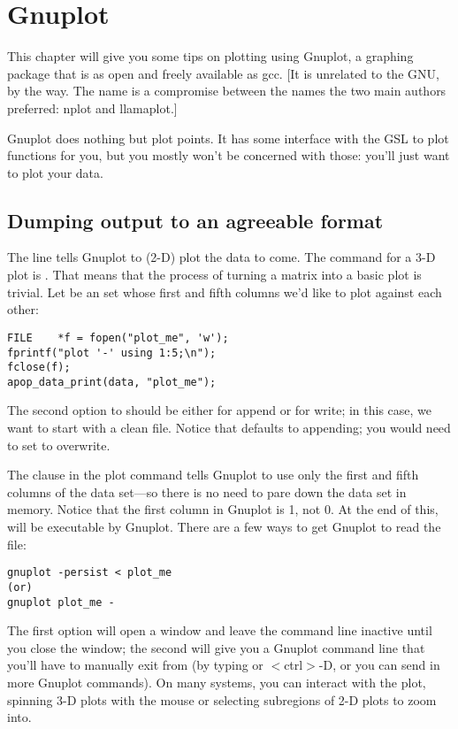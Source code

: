 \chapter{Gnuplot} \label{gnuplot}

This chapter will give you some tips on plotting using Gnuplot, a graphing package that is as
open and freely available as gcc. [It is unrelated to the GNU, by the way. The name is a compromise
between the names the two main authors preferred: nplot and llamaplot.]

Gnuplot does nothing but plot points. It has some interface with the GSL to plot functions for you, but
you mostly won't be concerned with those: you'll just want to plot your data.


\section{Dumping output to an agreeable format} 
The line  tells Gnuplot to (2-D) plot the data to come. The
command for a 3-D plot is . That means that the process
of turning a matrix into a basic plot is trivial. Let  be an
 set whose first and fifth columns we'd like to plot
against each other:
\begin{lstlisting}
FILE    *f = fopen("plot_me", 'w');
fprintf("plot '-' using 1:5;\n");
fclose(f);
apop_data_print(data, "plot_me");
\end{lstlisting}
The second option to  should be either  for append or
 for write; in this case, we want to start with a clean file.
Notice that  defaults to appending; you
would need to set  to overwrite.

The clause  in the plot command tells Gnuplot to use
only the first and fifth columns of the data set---so there is no need to pare
down the data set in memory. Notice that the first column in Gnuplot is
1, not 0. At the end of this,  will be executable by
Gnuplot. There are a few ways to get Gnuplot to read the file:
\begin{lstlisting}
gnuplot -persist < plot_me
(or)
gnuplot plot_me -
\end{lstlisting}
The first option will open a window and leave the command line inactive
until you close the window;
the second will give you a Gnuplot command line that you'll have to
manually exit
from (by typing  or $<$ctrl$>$-D, or you can send in more
Gnuplot commands). On many systems, you can
interact with the plot, spinning 3-D plots with the mouse or selecting
subregions of 2-D plots to zoom into.

